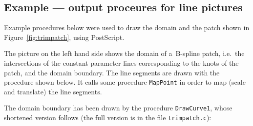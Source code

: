 \subsection*{Example --- output proceures for line pictures}

Example procedures below were used to draw the domain and the patch
shown in Figure~\ref{fig:trimpatch}, using PostScript.

The picture on the left hand side shows the domain of a~B-spline patch,
i.e.\ the intersections of the constant parameter lines corresponding to
the knots of the patch, and the domain boundary.
The line segments are drawn with the procedure shown below.
It calls some procedure \texttt{MapPoint} in order to map
(scale and translate) the line segments.

\vspace{\medskipamount}
\vspace{\medskipamount}

The domain boundary has been drawn by the procedure
\texttt{DrawCurve1}, whose shortened version follows
(the full version is in the file \texttt{trimpatch.c}):

